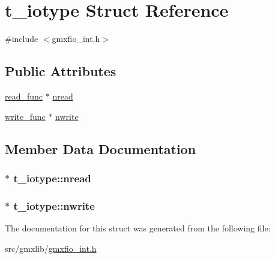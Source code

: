 \hypertarget{structt__iotype}{\section{t\-\_\-iotype \-Struct \-Reference}
\label{structt__iotype}
}


{\ttfamily \#include $<$gmxfio\-\_\-int.\-h$>$}

\subsection*{\-Public \-Attributes}
\begin{DoxyCompactItemize}
\item 
\hyperlink{gmxfio__int_8h_a446d14b36b6373031f24dd74f0c07031}{read\-\_\-func} $\ast$ \hyperlink{structt__iotype_a79eefe965b021d2c40a1c4db5b1a6cd8}{nread}
\item 
\hyperlink{gmxfio__int_8h_aae2009dc920853e1534163971b847f36}{write\-\_\-func} $\ast$ \hyperlink{structt__iotype_a8b3c928a1d11cfa6e531b743efae04cb}{nwrite}
\end{DoxyCompactItemize}


\subsection{\-Member \-Data \-Documentation}
\hypertarget{structt__iotype_a79eefe965b021d2c40a1c4db5b1a6cd8}{
\subsubsection[{nread}]{$\ast$ {\bf t\-\_\-iotype\-::nread}}}\label{structt__iotype_a79eefe965b021d2c40a1c4db5b1a6cd8}
\hypertarget{structt__iotype_a8b3c928a1d11cfa6e531b743efae04cb}{
\subsubsection[{nwrite}]{$\ast$ {\bf t\-\_\-iotype\-::nwrite}}}\label{structt__iotype_a8b3c928a1d11cfa6e531b743efae04cb}


\-The documentation for this struct was generated from the following file\-:\begin{DoxyCompactItemize}
\item 
src/gmxlib/\hyperlink{gmxfio__int_8h}{gmxfio\-\_\-int.\-h}\end{DoxyCompactItemize}
